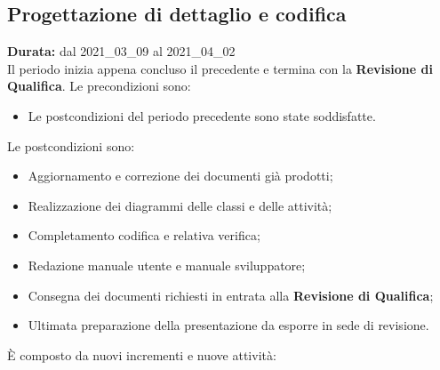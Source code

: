 \subsection{Progettazione di dettaglio e codifica}
\label{progettazione_di_dettaglio}
\textbf{Durata:} dal 2021\_03\_09 al 2021\_04\_02 \\
Il periodo inizia appena concluso il precedente e termina con la \textbf{Revisione di Qualifica}.
Le precondizioni sono:
\begin{itemize}
    \item Le postcondizioni del periodo precedente sono state soddisfatte.
\end{itemize}
Le postcondizioni sono:
\begin{itemize}
    \item Aggiornamento e correzione dei documenti già prodotti;
    \item Realizzazione dei diagrammi delle classi e delle attività;
    \item Completamento codifica e relativa verifica;
    \item Redazione manuale utente e manuale sviluppatore;
    \item Consegna dei documenti richiesti in entrata alla \textbf{Revisione di Qualifica};
    \item Ultimata preparazione della presentazione da esporre in sede di revisione.
\end{itemize}
È composto da nuovi incrementi e nuove attività:
